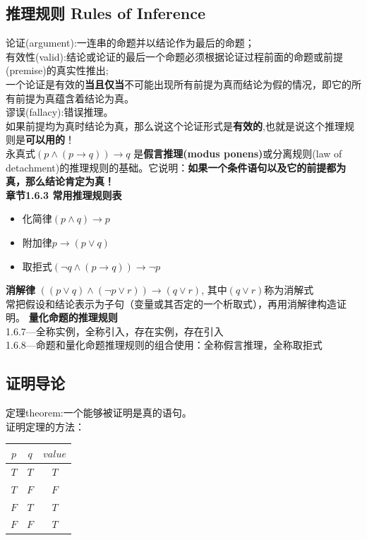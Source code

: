 \documentclass{article}
\begin{document}
    \subsection{推理规则 Rules of Inference}
    论证(argument):一连串的命题并以结论作为最后的命题；\\
    有效性(valid):结论或论证的最后一个命题必须根据论证过程前面的命题或前提(premise)的真实性推出;\\
    一个论证是有效的\textbf{当且仅当}不可能出现所有前提为真而结论为假的情况，即它的所有前提为真蕴含着结论为真。\\
    谬误(fallacy):错误推理。\\
    如果前提均为真时结论为真，那么说这个论证形式是\textbf{有效的},也就是说这个推理规则是\textbf{可以用的}！\\
    永真式$(p\wedge (p\rightarrow q)) \rightarrow q$ 是\textbf{假言推理(modus ponens)}或分离规则(law of detachment)的推理规则的基础。它说明：\textbf{如果一个条件语句以及它的前提都为真，那么结论肯定为真！}
    \\
    \textbf{章节1.6.3 常用推理规则表}
    \begin{itemize}
        \item 化简律$(p\wedge q)\rightarrow p$
        \item 附加律$p\rightarrow (p\vee q)$
        \item 取拒式$(\neg q \wedge (p\rightarrow q))\rightarrow \neg p$
    \end{itemize}
    \textbf{消解律}
    $((p \vee q) \wedge(\neg p \vee r)) \rightarrow(q \vee r)$, 其中$(q \vee r)$称为消解式 \\
    常把假设和结论表示为子句（变量或其否定的一个析取式），再用消解律构造证明。
    \textbf{量化命题的推理规则}\\
    1.6.7---全称实例，全称引入，存在实例，存在引入\\
    1.6.8---命题和量化命题推理规则的组合使用：全称假言推理，全称取拒式

    \subsection{证明导论}
    定理theorem:一个能够被证明是真的语句。\\
    证明定理的方法：\\
    \begin{tabular}{|c|c|c|}
       \hline
       $p$ & $q$ & $value$\\
       \hline
       $T$ & $T$ & $T$\\
       $T$ & $F$ & $F$\\
       $F$ & $T$ & $T$\\
       $F$ & $F$ & $T$\\
       \hline
    \end{tabular}
\end{document}
